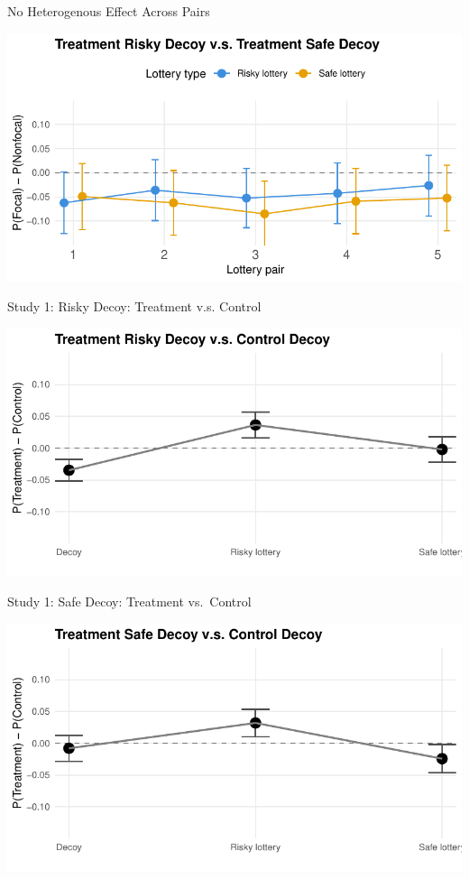 \documentclass[
  ignorenonframetext,
  aspectratio=169]{beamer}
\begin{document}
\begin{frame}{No Heterogenous Effect Across Pairs}
\label{no-heterogenous-effect-across-pairs}
\begin{flushright}\includegraphics{BE_Lab_1023_files/figure-beamer/unnamed-chunk-5-1} \end{flushright}
\end{frame}

\begin{frame}{Study 1: Risky Decoy: Treatment v.s. Control}
\label{study-1-risky-decoy-treatment-v.s.-control}
\begin{flushright}\includegraphics{BE_Lab_1023_files/figure-beamer/unnamed-chunk-7-1} \end{flushright}
\end{frame}

\begin{frame}{Study 1: Safe Decoy: Treatment vs.~Control}
\label{study-1-safe-decoy-treatment-vs.-control}
\begin{flushright}\includegraphics{BE_Lab_1023_files/figure-beamer/unnamed-chunk-9-1} \end{flushright}
\end{frame}
\end{document}
